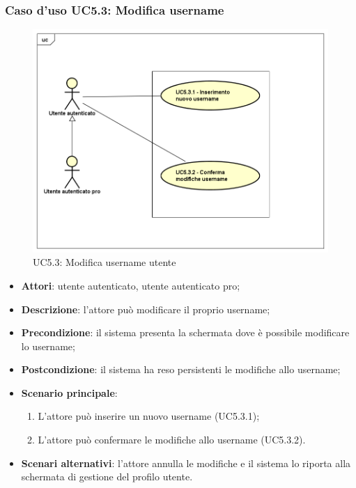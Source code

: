 \subsubsection{Caso d'uso UC5.3: Modifica username}
\label{UC5.3}
\begin{figure}[h]
	\centering
	\includegraphics[scale=0.5,keepaspectratio]{UML/UC5_3.png}
	\caption{UC5.3: Modifica username utente}
\end{figure}
\begin{itemize}
	\item \textbf{Attori}: utente autenticato, utente autenticato pro;
	\item \textbf{Descrizione}: l'attore può modificare il proprio username;
	\item \textbf{Precondizione}: il sistema presenta la schermata dove è possibile modificare lo username;
	\item \textbf{Postcondizione}: il sistema ha reso persistenti le modifiche allo username;
	\item \textbf{Scenario principale}:
	\begin{enumerate}
		\item L'attore può inserire un nuovo username (UC5.3.1);
		\item L'attore può confermare le modifiche allo username (UC5.3.2).
	\end{enumerate}
	\item \textbf{Scenari alternativi}: l'attore annulla le modifiche e il sistema lo riporta alla schermata di gestione del profilo utente.
\end{itemize}

